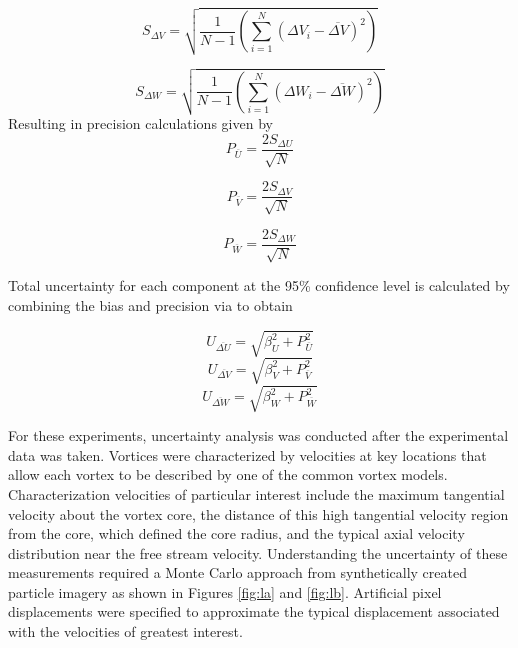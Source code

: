 \begin{equation}
S_{\Delta V} = \sqrt{\frac{1}{N-1} \left(\sum_{i=1}^N (\Delta V_i - 
	\overline{\Delta V})^2 \right)}
\label{eq:Vsd}
\end{equation}

\begin{equation}
S_{\Delta W} = \sqrt{\frac{1}{N-1} \left(\sum_{i=1}^N (\Delta W_i - 
	\overline{\Delta W})^2 \right)}
\label{eq:Wsd}
\end{equation}
%
Resulting in precision calculations given by 
%	
\begin{equation}
P_{\overline{U}} = \frac{2 S_{\Delta U}}{\sqrt{N}}
\label{eq:Uprec}
\end{equation}

\begin{equation}
P_{\overline{V}} = \frac{2 S_{\Delta V}}{\sqrt{N}}
\label{eq:Vprec}
\end{equation}

\begin{equation}
P_{\overline{W}} = \frac{2 S_{\Delta W}}{\sqrt{N}}
\label{eq:Wprec}
\end{equation}

Total uncertainty for each component at the 95\% confidence level is calculated 
by combining the bias and precision via to obtain

\begin{equation}
U_{\overline{\Delta U}} = \sqrt{\beta_{U}^2 + P_{\overline{U}}^2}
\label{eq:Uuncert}
\end{equation}
\begin{equation}
U_{\overline{\Delta V}} = \sqrt{\beta_{V}^2 + P_{\overline{V}}^2}
\label{eq:Vuncert}
\end{equation}
\begin{equation}
U_{\overline{\Delta W}} = \sqrt{\beta_{W}^2 + P_{\overline{W}}^2}
\label{eq:Wuncert}
\end{equation}


For these experiments, uncertainty analysis was conducted after the 
experimental data was taken. Vortices were characterized by velocities at key 
locations that allow each vortex to be described by one of the common vortex 
models. Characterization velocities of particular interest include the maximum 
tangential velocity about the vortex core, the distance of this high tangential 
velocity region from the core, which defined the core radius, and the typical 
axial velocity distribution near the free stream velocity. Understanding the 
uncertainty of these measurements required a Monte Carlo approach from 
synthetically created particle imagery as shown in Figures \ref{fig:la} and 
\ref{fig:lb}. Artificial pixel displacements were specified to approximate the 
typical displacement associated with the velocities of greatest interest. 

